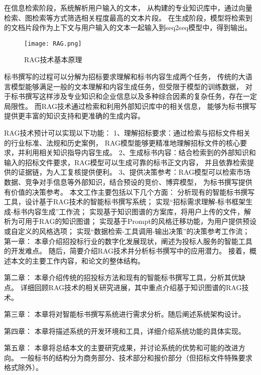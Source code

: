 \documentclass{xmu}
\begin{document}
\par
在信息检索阶段，系统解析用户输入的文本，
从构建的专业知识库中，通过向量检索、图检索等方式筛选相关程度最高的文本片段。
在生成阶段，模型将检索到的文档片段作为上下文与用户输入的文本一起输入到seq2seq模型中，得到输出。
\par
\begin{figure}[!htb]
    \centering
    \texttt{[image: RAG.png]}\\
    \caption{RAG技术基本原理}\label{xmulogo}
\end{figure}
标书撰写的过程可以分解为招标要求理解和标书内容生成两个任务，
传统的大语言模型能够满足一般的文本理解和内容生成任务，但受限于模型的训练数据，
对于标书撰写这样涉及专业知识和企业信息以及多种综合因素的复杂任务，存在一定局限性。
而RAG技术通过检索和利用外部知识库中的相关信息，
能够为标书撰写提供更丰富的知识支持和更准确的生成内容。

RAG技术预计可以实现以下功能：
1、理解招标要求：通过检索与招标文件相关的行业标准、法规和历史案例，
RAG模型能够更精准地理解招标文件的核心要求，并利用相关知识指导内容生成。
2、生成标书内容：结合检索到的外部知识和输入的招标文件要求，RAG模型可以生成可靠的标书正文内容，
并且依靠检索提供的证据链，为人工复核提供便利。
3、提供决策参考：RAG模型可以检索市场数据、竞争对手信息等外部知识，结合预设的竞价、博弈模型，
为标书撰写提供有价值的决策参考。
本文工作主要包括以下几个方面：
分析现有的智能标书撰写工具，设计基于RAG技术的智能标书撰写系统；
实现“招标需求理解-标书框架生成-标书内容生成”工作流；
实现基于知识图谱的方案库，将用户上传的文件，解析为可用于RAG的知识图谱；
实现基于Prompt的风格迁移功能，为用户提供预设或自定义的风格选项；
实现“数据检索-工具调用-输出决策”的决策参考工作流；
第一章：
本章介绍招投标行业的数字化发展现状，阐述为投标人服务的智能工具的开发难点。
随后，简要介绍RAG技术并分析标书撰写中的应用潜力。
接着，概述本文的主要工作内容，和论文的整体结构。
\par
第二章：
本章介绍传统的招投标方法和现有的智能标书撰写工具，分析其优缺点。
详细回顾RAG技术的相关研究进展，其中重点介绍基于知识图谱的RAG技术。
\par
第三章：
本章将对智能标书撰写系统进行需求分析。随后阐述系统架构设计。
\par
第四章：
本章将描述系统的开发环境和工具，详细介绍系统功能的具体实现。
\par
第五章：
本章将总结本文的主要研究成果，并讨论系统的优势和可能的改进方向。
一般标书的结构分为商务部分、技术部分和报价部分（但招标文件特殊要求格式除外）。
\end{document}
